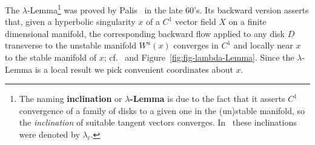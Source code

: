 \documentclass{article}
\begin{document}
The $\lambda$-Lemma\footnote{
  The naming {\bf inclination} or {\bf\boldmath $\lambda$-Lemma}
  is due to the fact that it asserts $C^1$ convergence of a family of
  disks to a given one in the (un)stable manifold, so the
  \emph{inclination} of suitable tangent vectors converges.
  In~\cite{Palis:1969a} these inclinations were denoted by $\lambda_\ell$.
  }
was proved by Palis~\cite{palis:1967a,Palis:1969a} in the late 60's.
Its backward version asserts that, given a hyperbolic singularity $x$ of a $C^1$
vector field $X$ on a finite dimensional manifold, the corresponding backward flow
applied to any disk $D$ transverse to the unstable manifold $W^u(x)$ converges in $C^1$
and locally near $x$ to the stable manifold of $x$; cf.~\cite[Ch.~2 \S7]{palis:1982a}
and Figure~\ref{fig:fig-lambda-Lemma}.
%
Since the $\lambda$-Lemma is a local result we pick
convenient coordinates about $x$.
\end{document}
